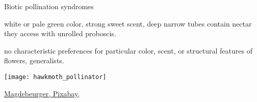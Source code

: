 \documentclass[t,hidelinks]{beamer}
\begin{document}
%
%
%	
%	
%
%	
%		
%	
%	
%
\begin{frame}[t]{Biotic pollination syndromes}

	\begin{multicols}{2}

	\hangpara {} white or pale green color, strong sweet scent, deep narrow tubes contain nectar they access with unrolled proboscis.%
	
	\hangpara {} no characteristic preferences for particular color, scent, or structural features of flowers, generalists. %

	
	\columnbreak
	
		\texttt{[image: hawkmoth\_pollinator]}
		
	\end{multicols}
	
	\vfilll
	
	\hfill \tiny \href{https://pixabay.com/en/hummingbird-hawk-moth-butterfly-542500/}{Magdebeurger, Pixabay, \cc{}}
\end{frame}
%
\end{document}
